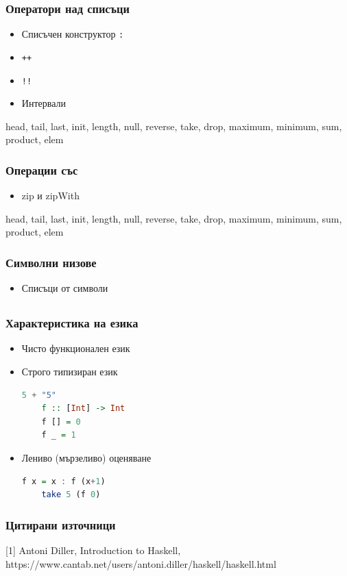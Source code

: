 \documentclass{beamer}
\begin{document}
\begin{frame}[fragile]
  \frametitle{Оператори над списъци}

  \begin{itemize}
    \item Списъчен конструктор \verb|:|
    \item \verb|++|
    \item \verb|!!|
    \item Интервали
  \end{itemize}

  \bigskip

  head, tail, last, init, length, null, reverse, take, drop, maximum, minimum, sum, product, elem

\end{frame}

\begin{frame}[fragile]
  \frametitle{Операции със}

  \begin{itemize}
    \item zip и zipWith
  \end{itemize}

  \bigskip

  head, tail, last, init, length, null, reverse, take, drop, maximum, minimum, sum, product, elem

\end{frame}


\begin{frame}[fragile]
  \frametitle{Символни низове}

  \begin{itemize}
    \item Списъци от символи
  \end{itemize}

  \bigskip
  

\end{frame}



\subsection{}


\begin{frame}[fragile]
  \frametitle{Характеристика на езика}
  
\begin{itemize}
  \item Чисто функционален език
  \item Строго типизиран език
  \begin{lstlisting}[basicstyle=\small, language=Haskell]
    5 + "5"
    f :: [Int] -> Int
    f [] = 0
    f _ = 1
    \end{lstlisting}
  \item Лениво (мързеливо) оценяване
  \begin{lstlisting}[basicstyle=\small, language=Haskell]
    f x = x : f (x+1)
    take 5 (f 0)
  \end{lstlisting}
\end{itemize}


\end{frame}


\begin{frame}[fragile]
  \frametitle{Цитирани източници}

    [1] Antoni Diller, Introduction to Haskell, 
        https://www.cantab.net/users/antoni.diller/haskell/haskell.html
\end{frame}
\end{document}

